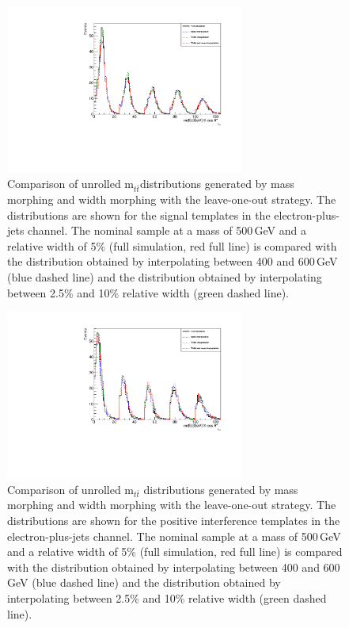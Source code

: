 \begin{figure}[!Hhtb]
\centering
\includegraphics[width=0.7\textwidth,keepaspectratio=true]{fig/chapt8/morphing/mass_morph_ejets_pos-sgn-5pc-M500.pdf}
\caption{Comparison of unrolled  m$_{t\bar t}$distributions generated by mass morphing and width morphing with the leave-one-out strategy. The distributions are shown for the signal templates in the electron-plus-jets channel. The nominal sample at a mass of 500\,GeV and a relative width of 5\% (full simulation, red full line) is compared with the distribution obtained by interpolating between 400 and 600\,GeV (blue dashed line) and the distribution obtained by interpolating between 2.5\% and 10\% relative width (green dashed line).}
\label{fig:morph_mass_ele_sgn_500_5}
\end{figure}
\begin{figure}[!Hhtb]
\centering
\includegraphics[width=0.7\textwidth,keepaspectratio=true]{fig/chapt8/morphing/mass_morph_ejets_pos-int-5pc-M500.pdf}
\caption{Comparison of unrolled m$_{t\bar t}$ distributions generated by mass morphing and width morphing with the leave-one-out strategy. The distributions are shown for the positive interference templates in the electron-plus-jets channel. The nominal sample at a mass of 500\,GeV and a relative width of 5\% (full simulation, red full line) is compared with the distribution obtained by interpolating between 400 and 600\,GeV (blue dashed line) and the distribution obtained by interpolating between 2.5\% and 10\% relative width (green dashed line).}
\label{fig:morph_mass_ele_posint_500_5}
\end{figure}

